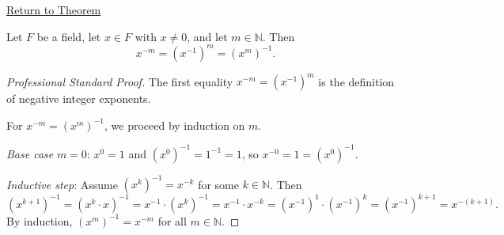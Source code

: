 \newpage
{}
\label{prf:negative-exponents-agree-with-inverse-power}

\begin{remark*}[Return]
\hyperref[thm:negative-exponents-agree-with-inverse-power]{Return to Theorem}
\end{remark*}

\begin{theorem*}
Let $F$ be a field, let $x\in F$ with $x\neq 0$, and let $m\in\mathbb{N}$.
Then
\[
x^{-m} = (x^{-1})^m = (x^m)^{-1}.
\]
\end{theorem*}

\begin{proof}[Professional Standard Proof]
\LRAProofBodyStart
The first equality $x^{-m} = (x^{-1})^m$ is the definition of negative
integer exponents.

For $x^{-m} = (x^m)^{-1}$, we proceed by induction on $m$.

\emph{Base case} $m=0$: $x^0 = 1$ and $(x^0)^{-1} = 1^{-1} = 1$, so
$x^{-0} = 1 = (x^0)^{-1}$.

\emph{Inductive step}: Assume $(x^k)^{-1} = x^{-k}$ for some $k\in\mathbb{N}$.
Then
\[
(x^{k+1})^{-1}
= (x^k\cdot x)^{-1}
= x^{-1}\cdot (x^k)^{-1}
= x^{-1}\cdot x^{-k}
= (x^{-1})^1\cdot(x^{-1})^k
= (x^{-1})^{k+1}
= x^{-(k+1)}.
\]
By induction, $(x^m)^{-1} = x^{-m}$ for all $m\in\mathbb{N}$.
\end{proof}

